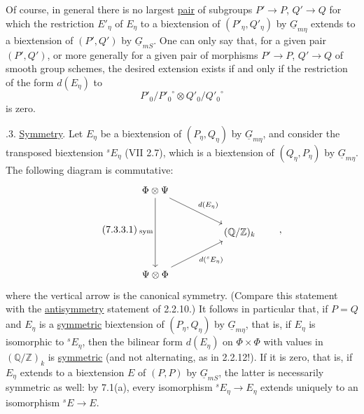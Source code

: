 Of course, in general there is no largest \underline{pair} of subgroups
$P'\to P$, $Q'\to Q$ for which the restriction $E'_\eta$ of $E_\eta$ to a
biextension of $(P'_\eta,Q'_\eta)$ by $\underline G_{m\eta}$ extends to a
biextension of $(P',Q')$ by $\underline G_{mS}$.  One can only say that,
for a given pair $(P',Q')$, or more generally for a given pair of
morphisms $P'\to P$, $Q'\to Q$ of smooth group schemes, the desired
extension exists if and only if the restriction of the form $d(E_\eta)$
to
\[
 P'_0/{P'_0}^{\circ}\otimes Q'_0/{Q'_0}^{\circ}
\]
is zero.

\medskip
{}.3.  \underline{Symmetry}.  Let $E_\eta$ be a biextension of
$(P_\eta,Q_\eta)$ by $\underline G_{m\eta}$, and consider the transposed
biextension ${}^{s}E_\eta$ (VII 2.7), which is a biextension of
$(Q_\eta,P_\eta)$ by $\underline G_{m\eta}$.  The following diagram is
commutative:
\begin{equation}\tag{7.3.3.1}
\begin{tikzcd}[row sep=large,column sep=huge]
 \Phi\otimes\Psi
   \arrow[dd,"\mathrm{sym}"']
   \arrow[rd,"d(E_\eta)"] & \\
 & (\mathbb Q/\mathbb Z)_k \\
 \Psi\otimes\Phi
   \arrow[ru,"d({}^{s}E_\eta)"'] &
\end{tikzcd}
\qquad ,
\end{equation}
where the vertical arrow is the canonical symmetry.  (Compare this
statement with the \underline{antisymmetry} statement of 2.2.10.)  It
follows in particular that, if $P=Q$ and $E_\eta$ is a
\underline{symmetric} biextension of $(P_\eta,Q_\eta)$ by
$\underline G_{m\eta}$, that is, if $E_\eta$ is isomorphic to
${}^{s}E_\eta$, then the bilinear form $d(E_\eta)$ on $\Phi\times\Phi$
with values in $(\mathbb Q/\mathbb Z)_k$ is \underline{symmetric} (and not
alternating, as in 2.2.12!).  If it is zero, that is, if $E_\eta$ extends
to a biextension $E$ of $(P,P)$ by $\underline G_{mS}$, the latter is
necessarily symmetric as well: by 7.1(a), every isomorphism
${}^{s}E_\eta\to E_\eta$ extends uniquely to an isomorphism
${}^{s}E\to E$.
